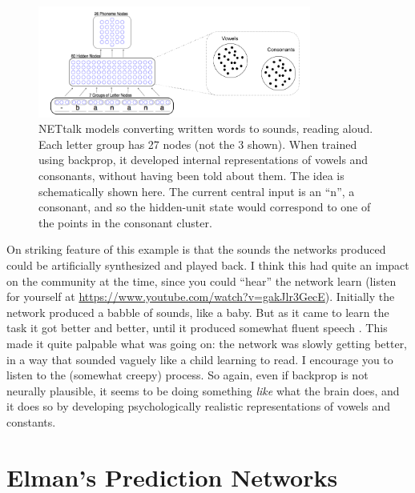 \begin{figure}[h]
\centering
\includegraphics[width=0.8\textwidth]{images/netTalkCategories.png}
\caption[Pamela Payne and Jeff Yoshimi.]{NETtalk models converting written words to sounds, \ie reading aloud. Each letter group has 27 nodes (not the 3 shown). When trained using backprop, it developed internal representations of vowels and consonants, without having been told about them. The idea is schematically shown here. The current central input is an ``n'', a consonant, and so the hidden-unit state would correspond to one of the points in the consonant cluster.}
\label{net_talk}
\end{figure}

On striking feature of this example is that the sounds the networks produced could be artificially synthesized and played back.  I think this had quite an impact on the community at the time, since you could ``hear'' the network learn (listen for yourself at  \url{https://www.youtube.com/watch?v=gakJlr3GecE}). Initially the network produced a babble of sounds, like a baby. But as it came to learn the task it got better and better, until it produced somewhat fluent speech \cite{sejnowski1987parallel}. This made it quite palpable what was going on: the network was slowly getting better, in a way that sounded vaguely like a child learning to read. I encourage you to listen to the (somewhat creepy) process. So again, even if backprop is not neurally plausible, it seems to be doing something \emph{like} what the brain does, and it does so by developing psychologically realistic representations of vowels and constants.

\section{Elman's Prediction Networks}

